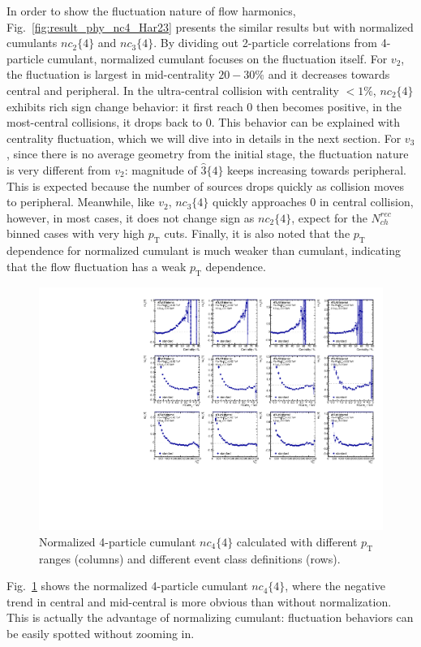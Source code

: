 In order to show the fluctuation nature of flow harmonics, Fig.~\ref{fig:result_phy_nc4_Har23} presents the similar results but with normalized cumulants $nc_2\{4\}$ and $nc_3\{4\}$. By dividing out 2-particle correlations from 4-particle cumulant, normalized cumulant focuses on the fluctuation itself. For $v_2$, the fluctuation is largest in mid-centrality $20-30\%$ and it decreases towards central and peripheral. In the ultra-central collision with centrality $<1\%$, $nc_2\{4\}$ exhibits rich sign change behavior: it first reach 0 then becomes positive, in the most-central collisions, it drops back to 0. This behavior can be explained with centrality fluctuation, which we will dive into in details in the next section. For $v_3$, since there is no average geometry from the initial stage, the fluctuation nature is very different from $v_2$: magnitude of $\hat{3}\{4\}$ keeps increasing towards peripheral. This is expected because the number of sources drops quickly as collision moves to peripheral. Meanwhile, like $v_2$, $nc_3\{4\}$ quickly approaches 0 in central collision, however, in most cases, it does not change sign as $nc_2\{4\}$, expect for the $N_{ch}^{rec}$ binned cases with very high $p_\text{T}$ cuts. Finally, it is also noted that the $p_\text{T}$ dependence for normalized cumulant is much weaker than cumulant, indicating that the flow fluctuation has a weak $p_\text{T}$ dependence.

\begin{figure}[H]
\centering
\includegraphics[width=.95\linewidth]{figs/sec_result/forQM/phy_nc4_Har4.pdf}
\caption{Normalized 4-particle cumulant $nc_4\{4\}$ calculated with different $p_\text{T}$ ranges (columns) and different event class definitions (rows).}
\label{fig:result_phy_nc4_Har4}
\end{figure}
Fig.~\ref{fig:result_phy_nc4_Har4} shows the normalized 4-particle cumulant $nc_4\{4\}$, where the negative trend in central and mid-central is more obvious than without normalization. This is actually the advantage of normalizing cumulant: fluctuation behaviors can be easily spotted without zooming in.

